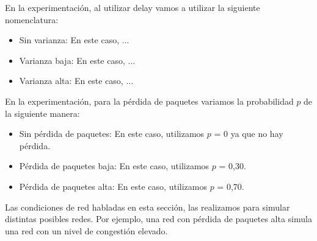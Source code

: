 
En la experimentación, al utilizar delay vamos a utilizar la siguiente nomenclatura:
\begin{itemize}
 \item Sin varianza: En este caso, ...
 \item Varianza baja: En este caso, ...
 \item Varianza alta: En este caso, ...
\end{itemize}
 
En la experimentación, para la pérdida de paquetes variamos la probabilidad $p$ de la siguiente manera:
\begin{itemize}
 \item Sin pérdida de paquetes: En este caso, utilizamos $p$ = 0 ya que no hay pérdida. 
 \item Pérdida de paquetes baja: En este caso, utilizamos $p$ = 0,30.
 \item Pérdida de paquetes alta: En este caso, utilizamos $p$ = 0,70.
\end{itemize}

Las condiciones de red habladas en esta sección, las realizamos para simular distintas posibles redes. Por ejemplo, una red con pérdida de paquetes alta simula una red con un nivel de congestión elevado.